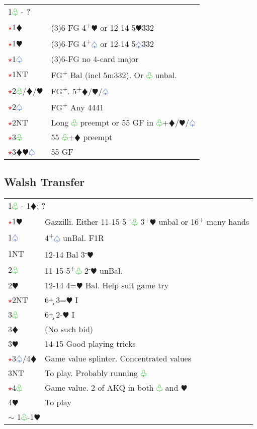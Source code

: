 \documentclass{article}
\renewcommand{\sp}{\textcolor{RoyalBlue}{$\varspade$}}
\newcommand{\he}{\textcolor{RubineRed}{$\varheart$}}
\newcommand{\di}{\textcolor{Peach}{$\vardiamond$}}
\newcommand{\cl}{\textcolor{LimeGreen}{$\varclub$}}
\newcommand{\nt}{\relsize{-1}NT\relsize{1}}
\newcommand{\up}{\textsuperscript{+}}
\newcommand{\down}{\textsuperscript{-}}
\newcommand{\al}{\textcolor{red}{$\star$}}
\begin{document}
\begin{tabular}{|l|p{6.5cm}}
	\multicolumn{2}{l}{1\cl{} - ? } \\
	\al{}1\di{} & (3)6-FG 4\up\he{} or 12-14 5\he{}332 \\
	\al{}1\he{} & (3)6-FG 4\up\sp{} or 12-14 5\sp{}332 \\
	\al{}1\sp{} & (3)6-FG no 4-card major \\
	\al{}1\nt & FG\up{} Bal (incl 5m332). Or \cl{} unbal. \\
	\al{}2\cl{}/\di{}/\he{} & FG\up{}. 5\up{}\di{}/\he{}/\sp{} \\
	\al{}2\sp{} & FG\up{} Any 4441 \\
	\al{}2\nt & Long \cl{} preempt or 55 GF in \cl{}+\di{}/\he{}/\sp{} \\
	\al{}3\cl{} & 55 \cl{}+\di{} preempt \\
	\al{}3\di{}\he{}\sp{} & 55 GF \\
\end{tabular}

\subsection{Walsh Transfer}
\begin{tabular}{|l|p{6.5cm}}
	\multicolumn{2}{l}{1\cl{} - 1\di{}; ?} \\
	\al{}1\he{} & Gazzilli. Either 11-15 5\up{}\cl{} 3\up{}\he{} unbal or 16\up{} many hands \\
		1\sp{} & 4\up\sp{} unBal. F1R \\
		1\nt & 12-14 Bal 3\down\he{}\\
		2\cl{} & 11-15 5\up\cl{} 2\down{}\he{} unBal.\\
		2\he{} & 12-14 4=\he{} Bal. Help suit game try \\
		\al{}2\nt & 6+\c{} 3=\he{} I \\
		3\cl{} & 6+\c{} 2-\he{} I \\
		3\di{} & (No such bid) \\
		3\he{} & 14-15 Good playing tricks \\
		\al{}3\sp{}/4\di{} & Game value splinter. Concentrated values \\
		3\nt{} & To play. Probably running \cl{} \\
		\al{}4\cl{} & Game value. 2 of AKQ in both \cl{} and \he{} \\
		4\he{} & To play \\ 
		\multicolumn{2}{l}{$\sim$ 1\cl{}-1\he{}}
\end{tabular}
\end{document}
